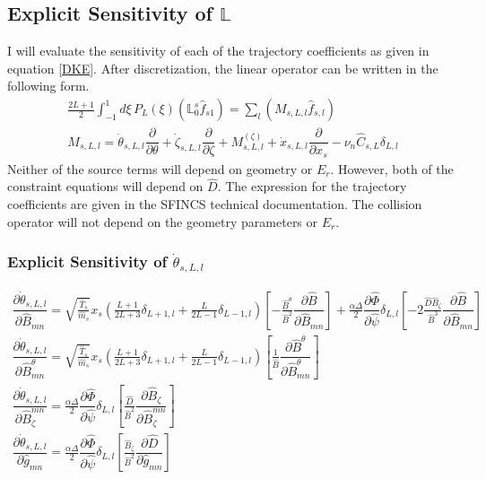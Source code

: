 \documentclass[11pt]{amsart}
\newcommand{\partder}[2]{\dfrac{\partial #1}{\partial #2}} %
\begin{document}
\subsection{Explicit Sensitivity of $\mathbb{L}$}
I will evaluate the sensitivity of each of the trajectory coefficients as given in equation \ref{DKE}. After discretization, the linear operator can be written in the following form.
\begin{gather}
\frac{2L+1}{2} \int_{-1}^1 d \xi \, P_L(\xi) (\mathbb{L}_0^s \hat{f}_{s1}) = \sum_l (M_{s,L,l} \hat{f}_{s,l})  \\
M_{s,L,l} = \dot{\theta}_{s,L,l} \partder{}{\theta} + \dot{\zeta}_{s,L,l} \partder{}{\zeta} + M_{s,L,l}^{(\zeta)} + \dot{x}_{s,L,l} \partder{}{x_s} - \nu_n \hat{C}_{s,L} \delta_{L,l}
\end{gather}
Neither of the source terms will depend on geometry or $E_r$. However, both of the constraint equations will depend on $\hat{D}$. 
The expression for the trajectory coefficients are given in the SFINCS technical documentation. The collision operator will not depend on the geometry parameters or $E_r$.

\subsubsection{Explicit Sensitivity of $\dot{\theta}_{s,L,l}$}
\begin{gather}
\partder{\dot{\theta}_{s,L,l}}{\hat{B}_{mn}} = \sqrt{\frac{\hat{T}_s}{\hat{m}_s}} x_s \left( \frac{L+1}{2L+3} \delta_{L+1,l} + \frac{L}{2L-1} \delta_{L-1,l} \right) \left[ -\frac{\hat{B}^{\theta}}{\hat{B}^2} \partder{\hat{B}}{\hat{B}_{mn}} \right] + \frac{\alpha \Delta}{2} \partder{\hat{\Phi}}{\hat{\psi}} \delta_{L,l} \left[ -2 \frac{ \hat{D} \hat{B}_{\zeta}}{\hat{B}^3} \partder{\hat{B}}{\hat{B}_{mn}} \right] \\
\partder{\dot{\theta}_{s,L,l}}{\hat{B}^{\theta}_{mn}} = \sqrt{\frac{\hat{T}_s}{\hat{m}_s}} x_s \left( \frac{L+1}{2L+3} \delta_{L+1,l} + \frac{L}{2L-1} \delta_{L-1,l} \right) \left[ \frac{1}{\hat{B}} \partder{\hat{B}^{\theta}}{\hat{B}^{\theta}_{mn}} \right] \\
\partder{\dot{\theta}_{s,L,l}}{\hat{B}_{\zeta}^{mn}} =  \frac{\alpha \Delta}{2} \partder{\hat{\Phi}}{\hat{\psi}} \delta_{L,l} \left[ \frac{\hat{D}}{\hat{B}^2} \partder{\hat{B}_{\zeta}}{\hat{B}_{\zeta}^{mn}} \right] \\
\partder{\dot{\theta}_{s,L,l}}{\hat{g}_{mn}} = \frac{\alpha \Delta}{2} \partder{\hat{\Phi}}{\hat{\psi}} \delta_{L,l} \left[ \frac{\hat{B}_{\zeta}}{\hat{B}^2} \partder{\hat{D}}{\hat{g}_{mn}} \right] \\
\end{gather}
\end{document}
